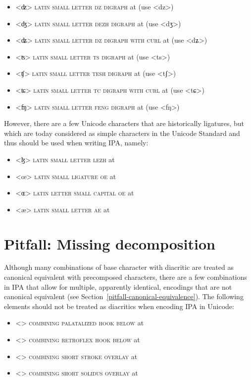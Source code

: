\begin{itemize} 
	\item[] <ʣ> \textsc{latin small letter dz digraph} at  
	  (use <dz>) 
    \item[] <ʤ> \textsc{latin small letter dezh digraph} at 
      (use <dʒ>)
    \item[] <ʥ> \textsc{latin small letter dz digraph with curl} at 
      (use <dʑ>)
    \item[] <ʦ> \textsc{latin small letter ts digraph} at  
      (use <ts>)
	\item[] <ʧ> \textsc{latin small letter tesh digraph} at  
	  (use <tʃ>) 
    \item[] <ʨ> \textsc{latin small letter tc digraph with curl} at 
      (use <tɕ>)
   	\item[] <ʩ> \textsc{latin small letter feng digraph} at 
	  (use <fŋ>) 
\end{itemize}

However, there are a few Unicode characters that are historically ligatures, but
which are today considered as simple characters in the Unicode Standard and thus
should be used when writing IPA, namely:

\begin{itemize}
	\item[] <ɮ> \textsc{latin small letter lezh} at  
	\item[] <œ> \textsc{latin small ligature oe} at  
	\item[] <ɶ> \textsc{latin letter small capital oe} at  
	\item[] <æ> \textsc{latin small letter ae} at  
\end{itemize}

\section{Pitfall: Missing decomposition}
\label{pitfall-missing-decomposition}

Although many combinations of base character with diacritic are treated as
canonical equivalent with precomposed characters, there are a few combinations
in IPA that allow for multiple, apparently identical, encodings that are not
canonical equivalent (see Section~\ref{pitfall-canonical-equivalence}). The
following elements should not be treated as diacritics when encoding IPA in
Unicode: 
\begin{itemize}
  \item[] <{}> \textsc{combining palatalized hook below} at 
  \item[] <{}> \textsc{combining retroflex hook below} at 
  \item[] <> \textsc{combining short stroke overlay} at 
  \item[] <> \textsc{combining short solidus overlay} at 
\end{itemize} 

